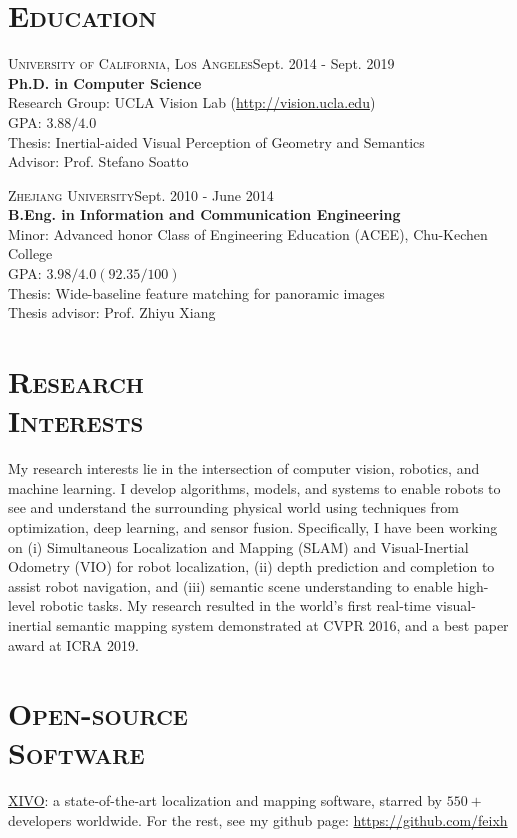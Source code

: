 \documentclass[margin, line, 10pt]{res} %
\begin{document}
\begin{resume}

\section{\textsc{Education}}
\textsc{University of California, Los Angeles}\hfill{Sept. 2014 - Sept. 2019}\\
{\bf Ph.D. in Computer Science}\\
Research Group: UCLA Vision Lab (\url{http://vision.ucla.edu})\\
GPA: $3.88/4.0$ \\
Thesis: Inertial-aided Visual Perception of Geometry and Semantics \\
Advisor: Prof. Stefano Soatto

\textsc{Zhejiang University}\hfill{Sept. 2010 - June 2014}\\
{\bf B.Eng. in Information and Communication Engineering}\\
Minor: Advanced honor Class of Engineering Education (ACEE), Chu-Kechen College\\
GPA: $3.98/4.0 (92.35/100)$ \\
Thesis: Wide-baseline feature matching for panoramic images\\
Thesis advisor: Prof. Zhiyu Xiang\\

\section{\textsc{Research\\Interests}}
My research interests lie in the intersection of computer vision, robotics, and machine learning. I develop algorithms, models, and systems to enable robots to see and understand the surrounding physical world using techniques from optimization, deep learning, and sensor fusion. Specifically, I have been working on (i) Simultaneous Localization and Mapping (SLAM) and Visual-Inertial Odometry (VIO) for robot localization, (ii) depth prediction and completion to assist robot navigation, and (iii) semantic scene understanding to enable high-level robotic tasks. My research resulted in the world's first real-time visual-inertial semantic mapping system demonstrated at CVPR 2016, and a best paper award at ICRA 2019.

\section{\textsc{Open-source\\Software}}
\href{https://github.com/ucla-vision/xivo}{XIVO}: a state-of-the-art localization and mapping software, starred by $550+$ developers worldwide.
For the rest, see my github page: \url{https://github.com/feixh}


\end{resume}
\end{document}
